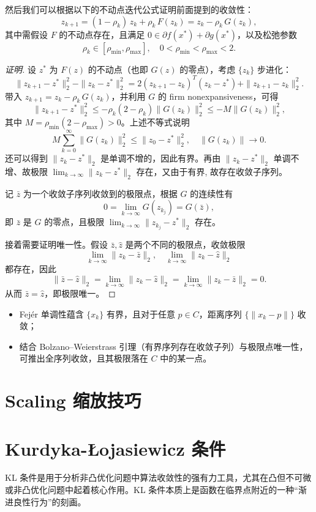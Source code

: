 然后我们可以根据以下的不动点迭代公式证明前面提到的收敛性：
\[
z_{k+1} = (1-\rho_k)\,z_k + \rho_k\,F(z_k)
= z_k - \rho_k\,G(z_k),
\]
其中需假设 $F$ 的不动点存在，且满足 $0\in \partial f(x^*)+\partial g(x^*)$，以及松弛参数
\[
\rho_k\in [\rho_{\min},\rho_{\max}],\quad
0<\rho_{\min}<\rho_{\max}<2.
\]

\begin{proof}[证明]
	设 $z^*$ 为 $F(z)$ 的不动点（也即 $G(z)$ 的零点），考虑 $\{z_k\}$ 步进化：
	\[
	\|z_{k+1}-z^*\|_2^2 - \|z_k-z^*\|_2^2
	= 2(z_{k+1}-z_k)^T(z_k-z^*) + \|z_{k+1}-z_k\|_2^2.
	\]
	带入 $z_{k+1}=z_k-\rho_k\,G(z_k)$，并利用 $G$ 的 firm nonexpansiveness，可得
	\[
	\|z_{k+1}-z^*\|_2^2
	\le -\rho_k(2-\rho_k)\|G(z_k)\|_2^2
	\le -M\|G(z_k)\|_2^2,
	\]
	其中 $M = \rho_{\min}(2-\rho_{\max})>0$。上述不等式说明
	\[
	M\sum_{k=0}^\infty \|G(z_k)\|_2^2 \le \|z_0-z^*\|_2^2,\quad
	\|G(z_k)\|\to 0.
	\]
	还可以得到 $\|z_k - z^*\|_2$ 是单调不增的，因此有界。再由 $\|z_k - z^*\|_2$ 单调不增、故极限 $\lim_{k\to\infty}\|z_k-z^*\|_2$ 存在，又由于有界, 故存在收敛子序列。
	
	记 $\bar z$ 为一个收敛子序列收敛到的极限点，根据 $G$ 的连续性有
	\[
	0 = \lim_{k\to\infty} G(z_{k_j}) = G(\bar z),
	\]
	即 $\bar z$ 是 $G$ 的零点，且极限 $\lim_{k\to\infty}\|z_{k_j}-z^*\|_2$ 存在。
	
	接着需要证明唯一性。假设 $\bar z,\hat z$ 是两个不同的极限点，收敛极限
	\[
	\lim_{k\to\infty}\|z_k-\bar z\|_2,\quad
	\lim_{k\to\infty}\|z_k-\hat z\|_2
	\]
	都存在，因此
	\[
	\|\bar z-\hat z\|_2
	= \lim_{k\to\infty}\|z_k-\hat z\|_2
	= \lim_{k\to\infty}\|z_k-\bar z\|_2 = 0.
	\]
	从而 $\bar z = \hat z$，即极限唯一。
\end{proof}
\begin{shaded}
	\begin{itemize}
		\item Fejér 单调性蕴含 $\{x_k\}$ 有界，且对于任意 $p\in C$，距离序列 $\{\|x_k-p\|\}$ 收敛；  
		\item 结合 Bolzano–Weierstrass 引理（有界序列存在收敛子列）与极限点唯一性，可推出全序列收敛，且其极限落在 $C$ 中的某一点。		
	\end{itemize}
\end{shaded}
\newpage
\section{Scaling 缩放技巧}
\newpage
\section{Kurdyka-Łojasiewicz 条件}
KL 条件是用于分析非凸优化问题中算法收敛性的强有力工具，尤其在凸但不可微或非凸优化问题中起着核心作用。KL 条件本质上是函数在临界点附近的一种“渐进良性行为”的刻画。

